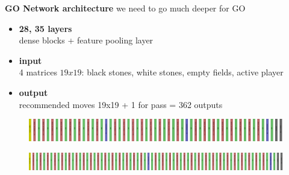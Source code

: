 \documentclass[xcolor=dvipsnames]{beamer}
\begin{document}
\begin{frame}{\bf GO Network architecture}
we need to go much deeper for GO
\begin{itemize}
  \item {\bf 28, 35 layers} \\ dense blocks + feature pooling layer
  \item {\bf input} \\ 4 matrices $19x19$: black stones, white stones, empty fields, active player
  \item {\bf output} \\ recommended moves 19x19 + 1 for pass = 362 outputs

\end{itemize}

  \begin{figure}[!htb]
    \centering
    \includegraphics[scale=0.06]{../../diagrams/net_go_1_28_layers.png}
  \end{figure}

  \begin{figure}[!htb]
    \centering
    \includegraphics[scale=0.06]{../../diagrams/net_go_5_35_layers.png}
  \end{figure}

\end{frame}
\end{document}
